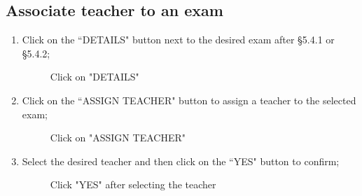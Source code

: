 \documentclass[ManualeUtente]{subfiles}
\begin{document}
	\subsection{Associate teacher to an exam}
	\begin{enumerate}
		\item Click on the \textquotedblleft DETAILS" button next to the desired exam after \S 5.4.1 or \S 5.4.2;
		\begin{figure}[H]
			\centering
			\caption{Click on "DETAILS"}
			\label{fig:Click on "DETAILS"}
		\end{figure}
		\item Click on the \textquotedblleft ASSIGN TEACHER" button to assign a teacher to the selected exam;
		\begin{figure}[H]
			\centering
			\caption{Click on "ASSIGN TEACHER"}
			\label{fig:Click on "ASSIGN TEACHER"}
		\end{figure}
		\item Select the desired teacher and then click on the \textquotedblleft YES" button to confirm;
		\begin{figure}[H]
			\centering
			\caption{Click "YES" after selecting the teacher}
			\label{fig:Click "YES" after selecting the teacher}
		\end{figure}
	\end{enumerate}
	
\end{document}
